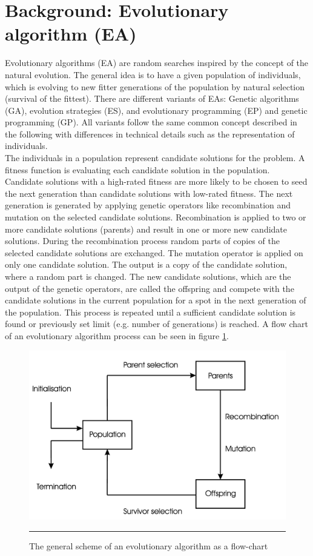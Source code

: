 \newpage
\section{Background: Evolutionary algorithm (EA)}
Evolutionary algorithms (EA) are random searches inspired by the concept of the natural evolution. The general idea is to have a given population of individuals, which is evolving to new fitter generations of the population by natural selection (survival of the fittest). There are different variants of EAs: Genetic algorithms (GA), evolution strategies (ES), and evolutionary programming (EP) and genetic programming (GP). All variants follow the same common concept described in the following with differences in technical details such as the representation of individuals\cite{Eiben}.\\
The individuals in a population represent candidate solutions for the problem. A fitness function is evaluating each candidate solution in the population. Candidate solutions with a high-rated fitness are more likely to be chosen to seed the next generation than candidate solutions with low-rated fitness. The next generation is generated by applying genetic operators like recombination and mutation on the selected candidate solutions. Recombination is applied to two or more candidate solutions (parents) and result in one or more new candidate solutions. During the recombination process random parts of copies of the selected candidate solutions are exchanged. The mutation operator is applied on only one candidate solution. The output is a copy of the candidate solution, where a random part is changed. The new candidate solutions, which are the output of the genetic operators, are called the offspring and compete with the candidate solutions in the current population for a spot in the next generation of the population. This process is repeated until a sufficient candidate solution is found or previously set limit (e.g. number of generations) is reached. A flow chart of an evolutionary algorithm process can be seen in figure \ref{fig:eaflowchart}.\\
\begin{figure}
    \centering
    \includegraphics[scale=0.08]{./Figures/eaflowchart.png}
    \rule{20em}{0.5pt}
    \caption{The general scheme of an evolutionary algorithm as a flow-chart \cite{Eiben}}
    \label{fig:eaflowchart}
\end{figure}
